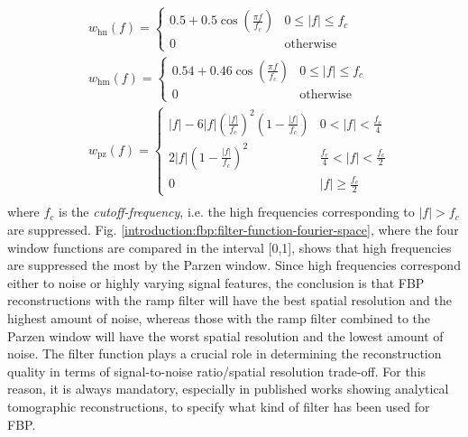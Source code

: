 {\begin{align*}
  &w_{\text{hn}}(f) = \begin{cases}\displaystyle
			  0.5 + 0.5 \cos\left(\frac{\pi f}{f_{c}}\right) & 0 \leq |f| \leq f_{c}\\
			  0 & \text{otherwise}
                       \end{cases}\nonumber\\[1em]
  & w_{\text{hm}}(f) = \begin{cases}\displaystyle
			  0.54 + 0.46 \cos\left(\frac{\pi f}{f_{c}}\right) & 0 \leq |f| \leq f_{c}\\
			  0 & \text{otherwise}
                       \end{cases} \nonumber\\[1em]
  &  w_{\text{pz}}(f) = \begin{cases}\displaystyle
			  |f| -6|f|\left(\frac{|f|}{f_{c}}\right)^{2} \left( 1 - \frac{|f|}{f_{c}} \right)  & \displaystyle 0 < |f| < \frac{f_{c}}{4}\\
			  \displaystyle 2|f|\left( 1 - \frac{|f|}{f_{c}} \right)^{2}  & \displaystyle \frac{f_{c}}{4} < |f| < \frac{f_{c}}{2}\\
			  0 & \displaystyle |f| \geq \frac{f_{c}}{2}
                       \end{cases}\nonumber\\                      
\end{align*}
where $f_{c}$ is the \emph{cutoff-frequency}, i.e. the high frequencies corresponding to $|f| > f_{c}$ are suppressed. 
Fig. \ref{introduction:fbp:filter-function-fourier-space}, where the four window functions are compared in the interval [0,1],
shows that high frequencies are suppressed the most by the Parzen window.
Since high frequencies correspond either to noise or highly varying signal features, the conclusion is that FBP reconstructions
with the ramp filter will have the best spatial resolution and the highest amount of noise, whereas those with the ramp filter combined to
the Parzen window will have the worst spatial resolution and the lowest amount of noise.
The filter function plays a crucial role in determining the reconstruction quality in terms of signal-to-noise ratio/spatial resolution trade-off.
For this reason, it is always mandatory,
especially in published works showing analytical tomographic reconstructions, to specify what kind of filter has been used for FBP.

}

